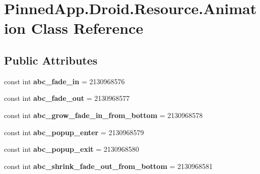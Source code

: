 \hypertarget{class_pinned_app_1_1_droid_1_1_resource_1_1_animation}{}\section{Pinned\+App.\+Droid.\+Resource.\+Animation Class Reference}
\label{class_pinned_app_1_1_droid_1_1_resource_1_1_animation}
\subsection*{Public Attributes}
\begin{DoxyCompactItemize}
\item 
\mbox{\label{class_pinned_app_1_1_droid_1_1_resource_1_1_animation_ad4c0d199c9c13a8c21d4e8e455d8796d}} 
const int {\bfseries abc\+\_\+fade\+\_\+in} = 2130968576
\item 
\mbox{\label{class_pinned_app_1_1_droid_1_1_resource_1_1_animation_aa9c3e375434cac1def8b1039b25cb571}} 
const int {\bfseries abc\+\_\+fade\+\_\+out} = 2130968577
\item 
\mbox{\label{class_pinned_app_1_1_droid_1_1_resource_1_1_animation_a48324e9fa5cc8d7b8fd37894a62c2fb0}} 
const int {\bfseries abc\+\_\+grow\+\_\+fade\+\_\+in\+\_\+from\+\_\+bottom} = 2130968578
\item 
\mbox{\label{class_pinned_app_1_1_droid_1_1_resource_1_1_animation_a95ff77e1c6bda6a3c572bb313adc514c}} 
const int {\bfseries abc\+\_\+popup\+\_\+enter} = 2130968579
\item 
\mbox{\label{class_pinned_app_1_1_droid_1_1_resource_1_1_animation_a27ad91e1da0967ac67bf808361e7dded}} 
const int {\bfseries abc\+\_\+popup\+\_\+exit} = 2130968580
\item 
\mbox{\label{class_pinned_app_1_1_droid_1_1_resource_1_1_animation_a285d677d2cc5211eb667625fff059e66}} 
const int {\bfseries abc\+\_\+shrink\+\_\+fade\+\_\+out\+\_\+from\+\_\+bottom} = 2130968581

\end{DoxyCompactItemize}
